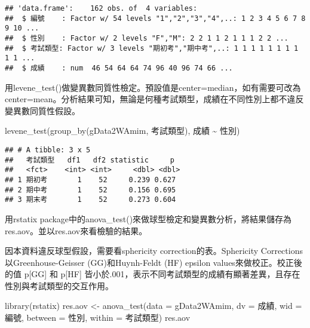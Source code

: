\documentclass[
]{book}
\newenvironment{Shaded}{\begin{snugshade}}{\end{snugshade}}
\newcommand{\AttributeTok}[1]{\textcolor[rgb]{0.77,0.63,0.00}{#1}}
\newcommand{\FunctionTok}[1]{\textcolor[rgb]{0.00,0.00,0.00}{#1}}
\newcommand{\NormalTok}[1]{#1}
\newcommand{\OtherTok}[1]{\textcolor[rgb]{0.56,0.35,0.01}{#1}}
\newcommand{\SpecialCharTok}[1]{\textcolor[rgb]{0.00,0.00,0.00}{#1}}
\begin{document}
\begin{verbatim}
## 'data.frame':    162 obs. of  4 variables:
##  $ 編號    : Factor w/ 54 levels "1","2","3","4",..: 1 2 3 4 5 6 7 8 9 10 ...
##  $ 性別    : Factor w/ 2 levels "F","M": 2 2 1 1 2 1 1 1 2 2 ...
##  $ 考試類型: Factor w/ 3 levels "期初考","期中考",..: 1 1 1 1 1 1 1 1 1 1 ...
##  $ 成績    : num  46 54 64 64 74 96 40 96 74 66 ...
\end{verbatim}

用levene\_test()做變異數同質性檢定。預設值是center=median，如有需要可改為center=mean。分析結果可知，無論是何種考試類型，成績在不同性別上都不違反變異數同質性假設。

\begin{Shaded}
\begin{Highlighting}[]
\FunctionTok{levene\_test}\NormalTok{(}\FunctionTok{group\_by}\NormalTok{(gData2WAmim, 考試類型), 成績 }\SpecialCharTok{\textasciitilde{}}\NormalTok{ 性別)}
\end{Highlighting}
\end{Shaded}

\begin{verbatim}
## # A tibble: 3 x 5
##   考試類型   df1   df2 statistic     p
##   <fct>    <int> <int>     <dbl> <dbl>
## 1 期初考       1    52     0.239 0.627
## 2 期中考       1    52     0.156 0.695
## 3 期末考       1    52     0.273 0.604
\end{verbatim}

用rstatix package中的anova\_test()來做球型檢定和變異數分析，將結果儲存為res.aov。並以res.aov來看檢驗的結果。

因本資料違反球型假設，需要看sphericity correction的表。Sphericity Corrections以Greenhouse-Geisser (GG)和Huynh-Feldt (HF) epsilon values來做校正。校正後的值 p{[}GG{]} 和 p{[}HF{]} 皆小於.001，表示不同考試類型的成績有顯著差異，且存在性別與考試類型的交互作用。

\begin{Shaded}
\begin{Highlighting}[]
\FunctionTok{library}\NormalTok{(rstatix)}
\NormalTok{res.aov }\OtherTok{\textless{}{-}} \FunctionTok{anova\_test}\NormalTok{(}\AttributeTok{data =}\NormalTok{ gData2WAmim, }\AttributeTok{dv =}\NormalTok{ 成績, }\AttributeTok{wid =}\NormalTok{ 編號, }\AttributeTok{between =}\NormalTok{ 性別, }\AttributeTok{within =}\NormalTok{ 考試類型)}
\NormalTok{res.aov}
\end{Highlighting}
\end{Shaded}
\end{document}
